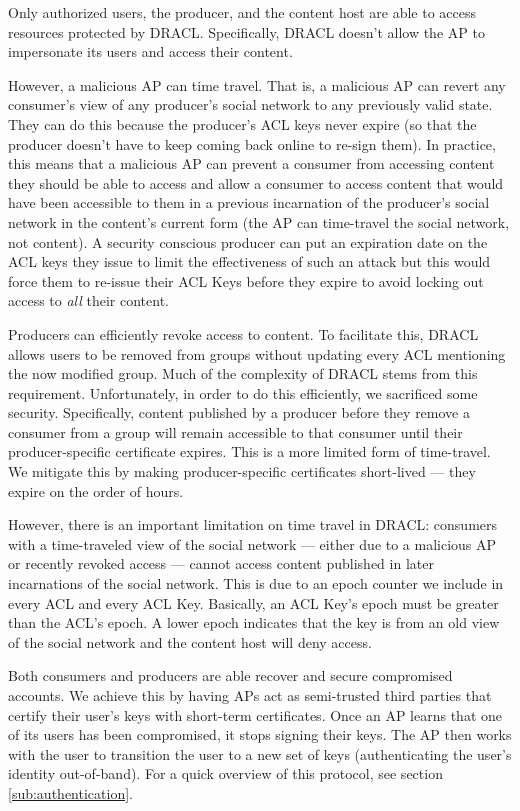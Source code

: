 \documentclass[pdftex,12pt,a4papaer,twoside,notitlepage]{report}
\begin{document}
Only authorized users, the producer, and the content host are able to access
resources protected by DRACL\@. Specifically, DRACL doesn't allow the AP to
impersonate its users and access their content.

However, a malicious AP can time travel. That is, a malicious AP can revert any
consumer's view of any producer's social network to any previously valid state.
They can do this because the producer's ACL keys never expire (so that the
producer doesn't have to keep coming back online to re-sign them). In practice,
this means that a malicious AP can prevent a consumer from accessing content
they should be able to access and allow a consumer to access content that would
have been accessible to them in a previous incarnation of the producer's social
network in the content's current form (the AP can time-travel the social network,
not content). A security conscious producer can put an expiration date on
the ACL keys they issue to limit the effectiveness of such an attack but this
would force them to re-issue their ACL Keys before they expire to avoid locking
out access to \emph{all} their content.

Producers can efficiently revoke access to content. To facilitate this, DRACL
allows users to be removed from groups without updating every ACL mentioning the
now modified group. Much of the complexity of DRACL stems from this requirement.
Unfortunately, in order to do this efficiently, we sacrificed some security.
Specifically, content published by a producer before they remove a consumer from
a group will remain accessible to that consumer until their producer-specific
certificate expires. This is a more limited form of time-travel. We mitigate
this by making producer-specific certificates short-lived --- they expire on the
order of hours.

However, there is an important limitation on time travel in DRACL: consumers
with a time-traveled view of the social network --- either due to a malicious AP
or recently revoked access --- cannot access content published in later
incarnations of the social network. This is due to an epoch counter we include
in every ACL and every ACL Key. Basically, an ACL Key's epoch must be greater
than the ACL's epoch. A lower epoch indicates that the key is from an old view
of the social network and the content host will deny access.

Both consumers and producers are able recover and secure compromised accounts.
We achieve this by having APs act as semi-trusted third parties that certify
their user's keys with short-term certificates. Once an AP learns that one of
its users has been compromised, it stops signing their keys. The AP then works
with the user to transition the user to a new set of keys (authenticating the
user's identity out-of-band). For a quick overview of this protocol, see section
\cref{sub:authentication}.
\end{document}

